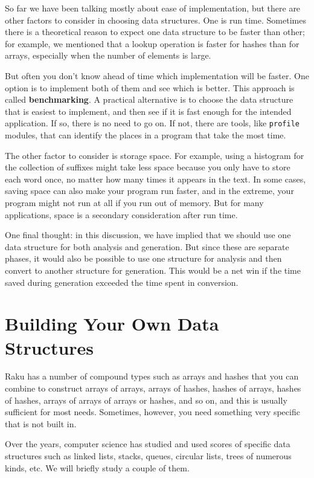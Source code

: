 So far we have been talking mostly about ease of implementation,
but there are other factors to consider in choosing data structures.
One is run time.  Sometimes there is a theoretical reason to expect
one data structure to be faster than other; for example, we mentioned
that a lookup operation is faster for hashes than for arrays,
especially when the number of elements is large.

But often you don't know ahead of time which implementation will
be faster.  One option is to implement both of them and see which
is better.  This approach is called {\bf benchmarking}.  A practical
alternative is to choose the data structure that is
easiest to implement, and then see if it is fast enough for the
intended application.  If so, there is no need to go on.  If not,
there are tools, like {\tt profile} modules, that can identify
the places in a program that take the most time.

The other factor to consider is storage space.  For example, using a
histogram for the collection of suffixes might take less space because
you only have to store each word once, no matter how many times it
appears in the text.  In some cases, saving space can also make your
program run faster, and in the extreme, your program might not run at
all if you run out of memory.  But for many applications, space is a
secondary consideration after run time.

One final thought: in this discussion, we have implied that
we should use one data structure for both analysis and generation.  But
since these are separate phases, it would also be possible to use one
structure for analysis and then convert to another structure for
generation.  This would be a net win if the time saved during
generation exceeded the time spent in conversion.

\section{Building Your Own Data Structures}

Raku has a number of compound types such as arrays and hashes 
that you can combine to construct arrays of arrays, arrays of 
hashes, hashes of arrays, hashes of hashes, arrays of arrays of 
arrays or hashes, and so on, and this is usually sufficient for 
most needs. Sometimes, however, you need something very specific 
that is not built in.

Over the years, computer science has studied and used scores of 
specific data structures such as linked lists, stacks, queues, 
circular lists, trees of numerous kinds, etc. We will briefly 
study a couple of them.


